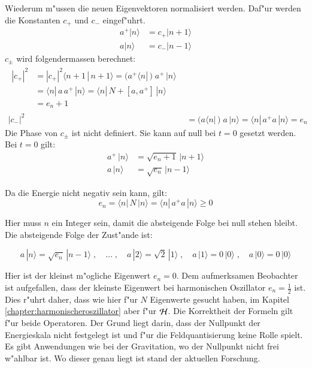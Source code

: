 Wiederum m"ussen die neuen Eigenvektoren normalisiert werden. Daf"ur werden die Konstanten $c_+$ und $c_-$ eingef"uhrt.
\begin{align*}
a^+|n\rangle &= c_+|n+1\rangle \\
a|n\rangle &= c_-|n-1\rangle
\end{align*}
$c_\pm$ wird folgendermassen berechnet:
\begin{align*}
\begin{split}
	|c_+|^2 &= |c_+|^2 \langle n+1 \, | \, n+1 \rangle = ( a^+ \langle n |\,) \; a^+ \,| n \rangle \\
		&= \langle n |\, a \, a^+ \,|n \rangle = \langle n |\, N + [a,a^+] \,|n \rangle \\
		&= e_n+1
\end{split}\\
	|c_-|^2 &= 	( a \langle n |\,) \; a \,| n \rangle = \langle n |\, a^+ a \,| n \rangle = e_n
\end{align*}
Die Phase von $c_{\pm}$ ist nicht definiert. Sie kann auf null bei $t=0$ gesetzt werden. Bei $t=0$ gilt:
\begin{align*}
a^+\,|n\rangle &= \sqrt{e_n+1}\,|n+1\rangle \\
a\,|n\rangle &= \sqrt{e_n}\,|n-1\rangle
\end{align*}

Da die Energie nicht negativ sein kann, gilt:
\begin{equation*}
e_n = \langle n |\, N \,|n \rangle = \langle n |\, a^+a \,|n \rangle \geq 0
\end{equation*}

Hier muss $n$ ein Integer sein, damit die absteigende Folge bei null stehen bleibt. Die absteigende Folge der Zust"ande ist:

\begin{equation*}
a\,|n\rangle = \sqrt{e_n}\,|n-1\rangle  \;, \quad \hdots \; , \quad a\,|2\rangle = \sqrt{2}\,|1\rangle \; , \quad a\,|1\rangle = 0\,|0\rangle \;, \quad a\,|0\rangle = 0\,|0\rangle
\end{equation*}

Hier ist der kleinst m"ogliche Eigenwert $e_n = 0$. Dem aufmerksamen Beobachter ist aufgefallen, dass der kleinste Eigenwert bei harmonischen Oszillator $e_n = \frac{1}{2}$ ist. Dies r"uhrt daher, dass wie hier f"ur $N$ Eigenwerte gesucht haben, im Kapitel \ref{chapter:harmonischeroszillator} aber f"ur ${\cal H}$. Die Korrektheit der Formeln gilt f"ur beide Operatoren. Der Grund liegt darin, dass der Nullpunkt der Energieskala nicht festgelegt ist und f"ur die Feldquantisierung keine Rolle spielt. Es gibt Anwendungen wie bei der Gravitation, wo der Nullpunkt nicht frei w"ahlbar ist. Wo dieser genau liegt ist stand der aktuellen Forschung.

